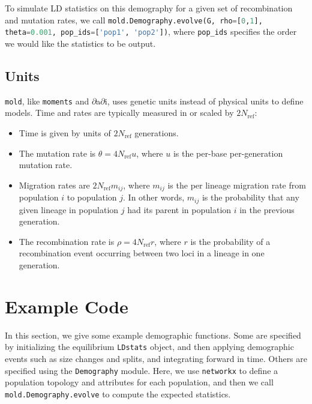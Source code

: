 \documentclass[10pt]{article}
\makeatletter
\newcommand{\dadi}{$\partial$a$\partial$i\xspace}
\newcommand{\mold}{\texttt{mold}\xspace}
\newcommand{\py}[1]{\lstinline[breaklines=true,language=Python, showstringspaces=False]@#1@}
\makeatother
\begin{document}
To simulate LD statistics on this demography for a given set of recombination and mutation rates, we call \py{mold.Demography.evolve(G, rho=[0,1], theta=0.001, pop_ids=['pop1', 'pop2'])}, where \py{pop_ids} specifies the order we would like the statistics to be output.


\subsection{Units}

\mold, like \texttt{moments} and \dadi, uses genetic units instead of physical units to define models.
Time and rates are typically measured in or scaled by $2N_\text{ref}$:
\begin{itemize}
\item Time is given by units of $2N_\text{ref}$ generations.
\item The mutation rate is $\theta=4N_\text{ref}u$, where $u$ is the per-base per-generation mutation rate.
\item Migration rates are $2N_\text{ref}m_{ij}$, where $m_{ij}$ is the per lineage migration rate from population $i$ to population $j$. In other words, $m_{ij}$ is the probability that any given lineage in population $j$ had its parent in population $i$ in the previous generation.
\item The recombination rate is $\rho=4N_\text{ref}r$, where $r$ is the probability of a recombination event occurring between two loci in a lineage in one generation.
\end{itemize}

\section{Example Code}

In this section, we give some example demographic functions.
Some are specified by initializing the equilibrium \py{LDstats} object, and then applying demographic events such as size changes and splits, and integrating forward in time.
Others are specified using the \py{Demography} module.
Here, we use \py{networkx} to define a population topology and attributes for each population, and then we call \py{mold.Demography.evolve} to compute the expected statistics.
\end{document}
